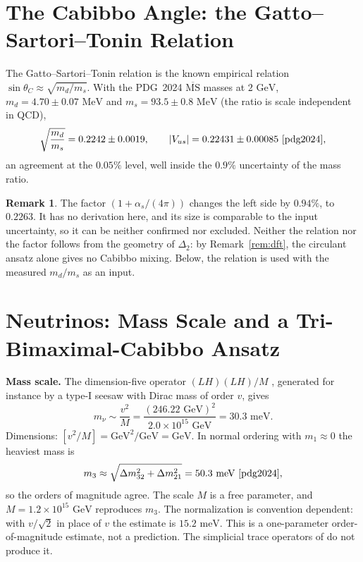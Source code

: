 \documentclass[11pt,reqno]{amsart}
\theoremstyle{definition}
\newtheorem{remark}[theorem]{Remark}
\begin{document}
\section{The Cabibbo Angle: the Gatto--Sartori--Tonin Relation}\label{sec:cabibbo}

The Gatto--Sartori--Tonin relation \cite{cabibbo1963unitary,gatto1968relation} is the known empirical relation $\sin\theta_C \approx \sqrt{m_d/m_s}$. With the PDG~2024 $\overline{\mathrm{MS}}$ masses at $2\text{ GeV}$, $m_d = 4.70 \pm 0.07\text{ MeV}$ and $m_s = 93.5 \pm 0.8\text{ MeV}$ (the ratio is scale independent in QCD),
\begin{equation}
    \sqrt{\frac{m_d}{m_s}} = 0.2242 \pm 0.0019, \qquad |V_{us}| = 0.22431 \pm 0.00085 \ \text{\cite{pdg2024}},
\end{equation}
an agreement at the $0.05\%$ level, well inside the $0.9\%$ uncertainty of the mass ratio.

\begin{remark}
The factor $(1 + \alpha_s/(4\pi))$ changes the left side by $0.94\%$, to $0.2263$. It has no derivation here, and its size is comparable to the input uncertainty, so it can be neither confirmed nor excluded. Neither the relation nor the factor follows from the geometry of $\Delta_2$: by Remark~\ref{rem:dft}, the circulant ansatz alone gives no Cabibbo mixing. Below, the relation is used with the measured $m_d/m_s$ as an input.
\end{remark}

\section{Neutrinos: Mass Scale and a Tri-Bimaximal-Cabibbo Ansatz}\label{sec:neutrino}

\textbf{Mass scale.} The dimension-five operator $(LH)(LH)/M$ \cite{weinberg1979baryon}, generated for instance by a type-I seesaw \cite{minkowski1977mu} with Dirac mass of order $v$, gives
\begin{equation}
    m_\nu \sim \frac{v^2}{M} = \frac{(246.22\text{ GeV})^2}{2.0 \times 10^{15}\text{ GeV}} = 30.3\text{ meV}.
\end{equation}
Dimensions: $[v^2/M] = \text{GeV}^2/\text{GeV} = \text{GeV}$. In normal ordering with $m_1 \approx 0$ the heaviest mass is
\begin{equation}
    m_3 \approx \sqrt{\Delta m^2_{32} + \Delta m^2_{21}} = 50.3\text{ meV} \ \text{\cite{pdg2024}},
\end{equation}
so the orders of magnitude agree. The scale $M$ is a free parameter, and $M = 1.2\times10^{15}\text{ GeV}$ reproduces $m_3$. The normalization is convention dependent: with $v/\sqrt2$ in place of $v$ the estimate is $15.2\text{ meV}$. This is a one-parameter order-of-magnitude estimate, not a prediction. The simplicial trace operators of \cite[Ch.~5]{silvafilho2026book} do not produce it.
\end{document}
